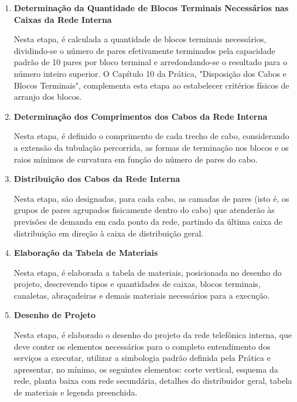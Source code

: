 \documentclass[12pt,openright,oneside,a4paper,brazil]{abntex2}
\begin{document}
\begin{enumerate}
    \item \textbf{Determinação da Quantidade de Blocos Terminais Necessários nas 
    Caixas da Rede Interna}
    
    \hspace{1.27cm}Nesta etapa, é calculada a quantidade de blocos terminais necessários, dividindo-se o número de pares efetivamente terminados pela capacidade padrão de 10 pares por bloco terminal e arredondando-se o resultado para o número inteiro superior. O Capítulo 10 da Prática, "Disposição dos Cabos e Blocos Terminais", complementa esta etapa ao estabelecer critérios físicos de arranjo dos blocos.

    \item \textbf{Determinação dos Comprimentos dos Cabos da Rede Interna}
    
    \hspace{1.27cm}Nesta etapa, é definido o comprimento de cada trecho de cabo, considerando a extensão da tubulação percorrida, as formas de terminação nos blocos e os raios mínimos de curvatura em função do número de pares do cabo.
    
    \item \textbf{Distribuição dos Cabos da Rede Interna}
    
    \hspace{1.27cm}Nesta etapa, são designadas, para cada cabo, as camadas de pares (isto é, os grupos de pares agrupados fisicamente dentro do cabo) que atenderão às previsões de demanda em cada ponto da rede, partindo da última caixa de distribuição em direção à caixa de distribuição geral.
    
    \item \textbf{Elaboração da Tabela de Materiais} 
    
    \hspace{1.27cm}Nesta etapa, é elaborada a tabela de materiais, posicionada no desenho do projeto, descrevendo tipos e quantidades de caixas, blocos terminais, canaletas, abraçadeiras e demais materiais necessários para a execução.
    
    \item \textbf{Desenho de Projeto}
    
    \hspace{1.27cm}Nesta etapa, é elaborado o desenho do projeto da rede telefônica interna, que deve conter os elementos necessários para o completo entendimento dos serviços a executar, utilizar a simbologia padrão definida pela Prática e apresentar, no mínimo, os seguintes elementos: corte vertical, esquema da rede, planta baixa com rede secundária, detalhes do distribuidor geral, tabela de materiais e legenda preenchida.
\end{enumerate}
\end{document}
